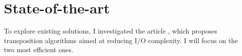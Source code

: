 \section{State-of-the-art}
To explore existing solutions, I investigated the article \cite{cache_efficiency}, which proposes transposition algorithms aimed at reducing I/O complexity. I will focus on the two most efficient ones.
